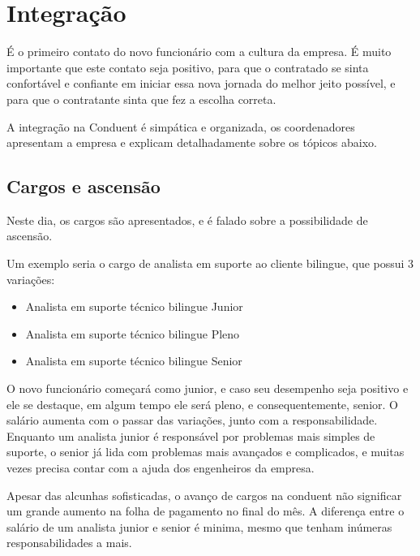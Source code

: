 \documentclass[12pt]{article}
\begin{document}
\newpage

\section{Integração}
É o primeiro contato do novo funcionário com a cultura da empresa. É muito importante que este contato seja positivo, para que o contratado se sinta confortável e confiante em iniciar essa nova jornada do melhor jeito possível, e para que o contratante sinta que fez a escolha correta. 

A integração na Conduent é simpática e organizada, os coordenadores apresentam a empresa e explicam detalhadamente sobre os tópicos abaixo.


\subsection{Cargos e ascensão}
Neste dia, os cargos são apresentados, e é falado sobre a possibilidade de ascensão.

Um exemplo seria o cargo de analista em suporte ao cliente bilingue, que possui 3 variações:

\begin{itemize}
\item Analista em suporte técnico bilingue Junior
\item Analista em suporte técnico bilingue Pleno
\item Analista em suporte técnico bilingue Senior
\end{itemize}


O novo funcionário começará como junior, e caso seu desempenho seja positivo e ele se destaque, em algum tempo ele será pleno, e consequentemente, senior. O salário aumenta com o passar das variações, junto com a responsabilidade. Enquanto um analista junior é responsável por problemas mais simples de suporte, o senior já lida com problemas mais avançados e complicados, e muitas vezes precisa contar com a ajuda dos engenheiros da empresa.

Apesar das alcunhas sofisticadas, o avanço de cargos na conduent não significar um grande aumento na folha de pagamento no final do mês. A diferença entre o salário de um analista junior e senior é minima, mesmo que tenham inúmeras responsabilidades a mais.
\end{document}
